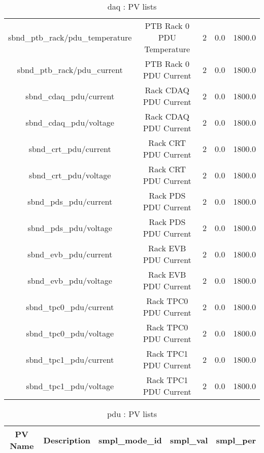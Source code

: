 \begin{table}[ptb]
\begin{tabular}{c | c c c c}
sbnd_ptb_rack/pdu_temperature & PTB Rack 0 PDU Temperature & 2 & 0.0 & 1800.0\\ 
sbnd_ptb_rack/pdu_current & PTB Rack 0 PDU Current & 2 & 0.0 & 1800.0\\ 
sbnd_cdaq_pdu/current & Rack CDAQ PDU Current & 2 & 0.0 & 1800.0\\ 
sbnd_cdaq_pdu/voltage & Rack CDAQ PDU Current & 2 & 0.0 & 1800.0\\ 
sbnd_crt_pdu/current & Rack CRT PDU Current & 2 & 0.0 & 1800.0\\ 
sbnd_crt_pdu/voltage & Rack CRT PDU Current & 2 & 0.0 & 1800.0\\ 
sbnd_pds_pdu/current & Rack PDS PDU Current & 2 & 0.0 & 1800.0\\ 
sbnd_pds_pdu/voltage & Rack PDS PDU Current & 2 & 0.0 & 1800.0\\ 
sbnd_evb_pdu/current & Rack EVB PDU Current & 2 & 0.0 & 1800.0\\ 
sbnd_evb_pdu/voltage & Rack EVB PDU Current & 2 & 0.0 & 1800.0\\ 
sbnd_tpc0_pdu/current & Rack TPC0 PDU Current & 2 & 0.0 & 1800.0\\ 
sbnd_tpc0_pdu/voltage & Rack TPC0 PDU Current & 2 & 0.0 & 1800.0\\ 
sbnd_tpc1_pdu/current & Rack TPC1 PDU Current & 2 & 0.0 & 1800.0\\ 
sbnd_tpc1_pdu/voltage & Rack TPC1 PDU Current & 2 & 0.0 & 1800.0\\ 

\hline
\end{tabular}
\caption{daq : PV lists}
\label{tab:daq_PV_list}
\end{table}

\begin{table}[ptb]
\centering
\begin{tabular}{c | c c c c}
\hline
PV Name & Description & smpl_mode_id & smpl_val & smpl_per \\ 

\hline

\hline
\end{tabular}
\caption{pdu : PV lists}
\label{tab:pdu_PV_list}
\end{table}

